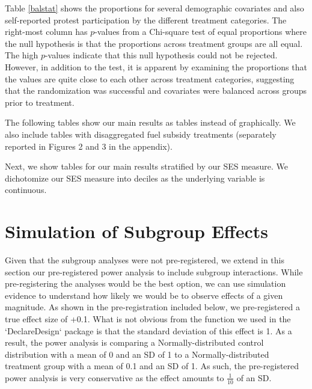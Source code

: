 \documentclass[12pt, letterpaper]{article}
\begin{document}
Table \ref{balstat} shows the proportions for several demographic covariates and also self-reported protest participation by the different treatment categories. The right-most column has $p$-values from a Chi-square test of equal proportions where the null hypothesis is that the proportions across treatment groups are all equal. The high $p$-values indicate that this null hypothesis could not be rejected. However, in addition to the test, it is apparent by examining the proportions that the values are quite close to each other across treatment categories, suggesting that the randomization was successful and covariates were balanced across groups prior to treatment.



The following tables show our main results as tables instead of graphically. We also include tables with disaggregated fuel subsidy treatments (separately reported in Figures 2 and 3 in the appendix).






\newpage

Next, we show tables for our main results stratified by our SES measure. We dichotomize our SES measure into deciles as the underlying variable is continuous. 




\section{Simulation of Subgroup Effects}

Given that the subgroup analyses were not pre-registered, we extend in this section our pre-registered power analysis to include subgroup interactions. While pre-registering the analyses would be the best option, we can use simulation evidence to understand how likely we would be to observe effects of a given magnitude. As shown in the pre-registration included below, we pre-registered a true effect size of +0.1. What is not obvious from the function we used in the `DeclareDesign` package is that the standard deviation of this effect is 1. As a result, the power analysis is comparing a Normally-distributed control distribution with a mean of 0 and an SD of 1 to a Normally-distributed treatment group with a mean of 0.1 and an SD of 1. As such, the pre-registered power analysis is very conservative as the effect amounts to $\frac{1}{10}$ of an SD. 
\end{document}
